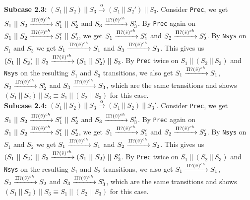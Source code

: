 \indent \textbf{Subcase 2.3: }$(S_1 \ || \ S_2)\ ||\ S_3 \xrightarrow[]{\alpha} (S_1 \ || \ S_2')\ ||\ S_3$. Consider \texttt{Prec}, we get $S_1 \ || \ S_2 \xrightarrow[]{\Pi ? (\Tilde{v})^{ch}} S_1' \ || \ S_2'$ and $S_3 \xrightarrow[]{\Pi ? (\Tilde{v})^{ch}} S_3'$. By \texttt{Prec} again on $S_1 \ || \ S_2 \xrightarrow[]{\Pi ? (\Tilde{v})^{ch}} S_1' \ || \ S_2'$, we get $S_1 \xrightarrow[]{\Pi ? (\Tilde{v})^{ch}} S_1'$ and $S_2 \xrightarrow[]{\Pi ? (\Tilde{v})^{ch}} S_2'$. By \texttt{Nsys} on $S_1$ and $S_3$ we get $S_1 \xrightarrow[]{\Pi ? (\Tilde{v})^{ch}} S_1$ and $S_3 \xrightarrow[]{\Pi ? (\Tilde{v})^{ch}} S_3$. This gives us $(S_1 \ || \ S_2)\ ||\ S_3 \xrightarrow[]{\Pi ? (\Tilde{v})^{ch}} (S_1 \ || \ S_2')\ ||\ S_3$. By \texttt{Prec} twice on $S_1 \ ||\ (S_2 \ || \ S_3)$ and \texttt{Nsys} on the resulting $S_1$ and $S_3$ transitions, we also get $S_1 \xrightarrow[]{\Pi ? (\Tilde{v})^{ch}} S_1$, $S_2 \xrightarrow[]{\Pi ? (\Tilde{v})^{ch}} S_2'$ and $S_3 \xrightarrow[]{\Pi ? (\Tilde{v})^{ch}} S_3$, which are the same transitions and shows $(S_1 \ ||\ S_2 )\ || \ S_3 \equiv S_1 \ ||\ (S_2 \ || \ S_3)$ for this case.\\
\indent \textbf{Subcase 2.4: }$(S_1 \ || \ S_2)\ ||\ S_3 \xrightarrow[]{\alpha} (S_1 \ || \ S_2)\ ||\ S_3'$. Consider \texttt{Prec}, we get $S_1 \ || \ S_2 \xrightarrow[]{\Pi ? (\Tilde{v})^{ch}} S_1' \ || \ S_2'$ and $S_3 \xrightarrow[]{\Pi ? (\Tilde{v})^{ch}} S_3'$. By \texttt{Prec} again on $S_1 \ || \ S_2 \xrightarrow[]{\Pi ? (\Tilde{v})^{ch}} S_1' \ || \ S_2'$, we get $S_1 \xrightarrow[]{\Pi ? (\Tilde{v})^{ch}} S_1'$ and $S_2 \xrightarrow[]{\Pi ? (\Tilde{v})^{ch}} S_2'$. By \texttt{Nsys} on $S_1$ and $S_2$ we get $S_1 \xrightarrow[]{\Pi ? (\Tilde{v})^{ch}} S_1$ and $S_2 \xrightarrow[]{\Pi ? (\Tilde{v})^{ch}} S_2$. This gives us $(S_1 \ || \ S_2)\ ||\ S_3 \xrightarrow[]{\Pi ? (\Tilde{v})^{ch}} (S_1 \ || \ S_2)\ ||\ S_3'$. By \texttt{Prec} twice on $S_1 \ ||\ (S_2 \ || \ S_3)$ and \texttt{Nsys} on the resulting $S_1$ and $S_2$ transitions, we also get $S_1 \xrightarrow[]{\Pi ? (\Tilde{v})^{ch}} S_1$, $S_2 \xrightarrow[]{\Pi ? (\Tilde{v})^{ch}} S_2$ and $S_3 \xrightarrow[]{\Pi ? (\Tilde{v})^{ch}} S_3'$, which are the same transitions and shows $(S_1 \ ||\ S_2 )\ || \ S_3 \equiv S_1 \ ||\ (S_2 \ || \ S_3)$ for this case.\\
